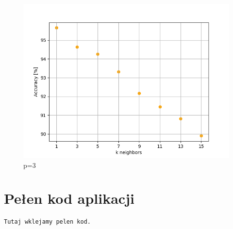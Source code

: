 \documentclass[12pt,a4paper]{article}
\begin{document}
	\begin{figure}[!htb]
		\includegraphics{"knn3.png"}
		\centering
		\caption{p=3}
	\end{figure}
	\newpage
	\section*{Pełen kod aplikacji}
\begin{lstlisting}
Tutaj wklejamy pelen kod. 
\end{lstlisting}
\end{document}
